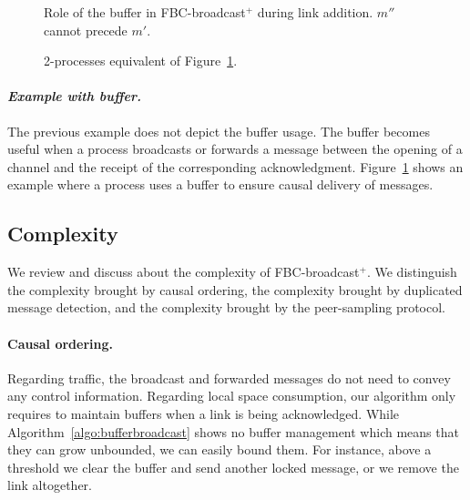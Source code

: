 \begin{figure}
  \begin{center}
    
    \caption{\label{fig:buffer}Role of the buffer in FBC-broadcast$^+$ during
      link addition. $m''$ cannot precede $m'$. }
  \end{center}
\end{figure}

\begin{figure}
  \begin{center}
    
    \caption{\label{fig:eq2buffer}2-processes equivalent of
      Figure~\ref{fig:buffer}.}
  \end{center}
\end{figure}

\paragraph{\emph{Example with buffer.}} The previous example does not depict the
buffer usage. The buffer becomes useful when a process broadcasts or forwards a
message between the opening of a channel and the receipt of the corresponding
acknowledgment. Figure~\ref{fig:buffer} shows an example where a process uses a
buffer to ensure causal delivery of messages.  


\subsection{Complexity}
\label{subsec:complexity}

We review and discuss about the complexity of FBC-broadcast$^+$. We distinguish
the complexity brought by causal ordering, the complexity brought by duplicated
message detection, and the complexity brought by the peer-sampling protocol.

\paragraph{Causal ordering.} Regarding traffic, the broadcast and forwarded
messages do not need to convey any control information. Regarding local space
consumption, our algorithm only requires to maintain buffers when a link is
being acknowledged. While Algorithm~\ref{algo:bufferbroadcast} shows no buffer
management which means that they can grow unbounded, we can easily bound
them. For instance, above a threshold we clear the buffer and send another
locked message, or we remove the link altogether.

